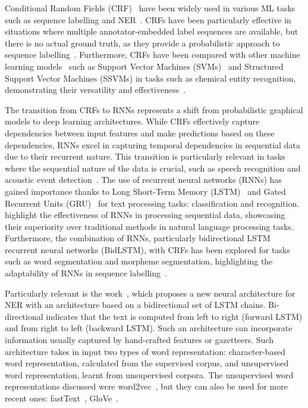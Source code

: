 Conditional Random Fields (CRF)~\cite{lafferty2001conditional} have been widely used in various ML tasks such as sequence labelling and NER~\cite{rodriguez2013sequence}. 
CRFs have been particularly effective in situations where multiple annotator-embedded label sequences are available, but there is no actual ground truth, as they provide a probabilistic approach to sequence labelling~\cite{rodriguez2013sequence}. 
Furthermore, CRFs have been compared with other machine learning models~\cite{tang2015aComparison} such as Support Vector Machines (SVMs)~\cite{boser1992training} and Structured Support Vector Machines (SSVMs) in tasks such as chemical entity recognition, demonstrating their versatility and effectiveness~\cite{tang2015aComparison, naseem2021aComparative, yang2019madex}.


The transition from CRFs to RNNs represents a shift from probabilistic graphical models to deep learning architectures. 
While CRFs effectively capture dependencies between input features and make predictions based on these dependencies, RNNs excel in capturing temporal dependencies in sequential data due to their recurrent nature. 
This transition is particularly relevant in tasks where the sequential nature of the data is crucial, such as speech recognition and acoustic event detection~\cite{graves2013speech,tian2020artificial}.
The use of recurrent neural networks (RNNs) has gained importance thanks to Long Short-Term Memory (LSTM)~\cite{sak2014long} and Gated Recurrent Units (GRU)~\cite{cho2001learning} for text processing tasks: classification and recognition. 
\cite{kim2022research, lyu2020combine,li2022channel, siswantining2023spratama} highlight the effectiveness of RNNs in processing sequential data, showcasing their superiority over traditional methods in natural language processing tasks.
Furthermore, the combination of RNNs, particularly bidirectional LSTM recurrent neural networks (BidLSTM), with CRFs has been explored for tasks such as word segmentation and morpheme segmentation, highlighting the adaptability of RNNs in sequence labelling~\cite{huang2015bidirectional}.

Particularly relevant is the work~\cite{lample2016neural}, which proposes a new neural architecture for NER with an architecture based on a bidirectional set of LSTM chains. 
Bi-directional indicates that the text is computed from left to right (forward LSTM) and from right to left (backward LSTM). 
Such an architecture can incorporate information usually captured by hand-crafted features or gazetteers. 
Such architecture takes in input two types of word representation: character-based word representation, calculated from the supervised corpus, and unsupervised word representation, learnt from unsupervised corpora. 
The unsupervised word representations discussed were word2vec~\cite{mikolov2013efficient}, but they can also be used for more recent ones: fastText~\cite{joulin2016fasttext}, GloVe~\cite{pennington2014glove}.

